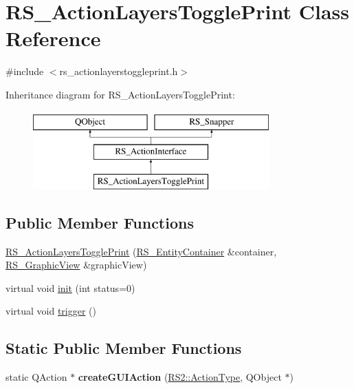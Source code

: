 \hypertarget{classRS__ActionLayersTogglePrint}{\section{R\-S\-\_\-\-Action\-Layers\-Toggle\-Print Class Reference}
\label{classRS__ActionLayersTogglePrint}
}


{\ttfamily \#include $<$rs\-\_\-actionlayerstoggleprint.\-h$>$}

Inheritance diagram for R\-S\-\_\-\-Action\-Layers\-Toggle\-Print\-:\begin{figure}[H]
\begin{center}
\leavevmode
\includegraphics[height=3.000000cm]{classRS__ActionLayersTogglePrint}
\end{center}
\end{figure}
\subsection*{Public Member Functions}
\begin{DoxyCompactItemize}
\item 
\hyperlink{classRS__ActionLayersTogglePrint_ada6f1f1bca24878d4ab94485f1863d6f}{R\-S\-\_\-\-Action\-Layers\-Toggle\-Print} (\hyperlink{classRS__EntityContainer}{R\-S\-\_\-\-Entity\-Container} \&container, \hyperlink{classRS__GraphicView}{R\-S\-\_\-\-Graphic\-View} \&graphic\-View)
\item 
virtual void \hyperlink{classRS__ActionLayersTogglePrint_a8df44ca46adf9478890d663a6d7152d6}{init} (int status=0)
\item 
virtual void \hyperlink{classRS__ActionLayersTogglePrint_a6e61f045f1ffacd57506b82e1af87d32}{trigger} ()
\end{DoxyCompactItemize}
\subsection*{Static Public Member Functions}
\begin{DoxyCompactItemize}
\item 
\hypertarget{classRS__ActionLayersTogglePrint_a8f95423d9e788e9879189b1b143d945b}{static Q\-Action $\ast$ {\bfseries create\-G\-U\-I\-Action} (\hyperlink{classRS2_afe3523e0bc41fd637b892321cfc4b9d7}{R\-S2\-::\-Action\-Type}, Q\-Object $\ast$)}\label{classRS__ActionLayersTogglePrint_a8f95423d9e788e9879189b1b143d945b}

\end{DoxyCompactItemize}
